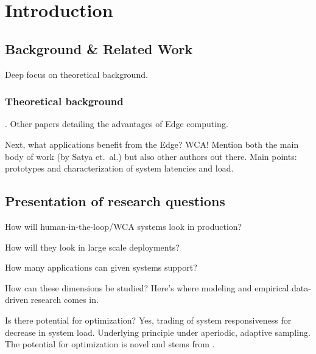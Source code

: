 \chapter{Introduction}

\section{Background \& Related Work}

Deep focus on theoretical background.

\subsection{Theoretical background}
\textcite{Satya2009Case}.
Other papers detailing the advantages of Edge computing.

Next, what applications benefit from the Edge?
\ac{WCA}! Mention both the main body of work (by Satya et.\ al.) but also other authors out there.
Main points: prototypes and characterization of system latencies and load.


\section{Presentation of research questions}

How will human-in-the-loop/\ac{WCA} systems look in production?

How will they look in large scale deployments?

How many applications can given systems support?

How can these dimensions be studied?
Here's where modeling and empirical data-driven research comes in.

Is there potential for optimization?
Yes, trading of system responsiveness for decrease in system load.
Underlying principle under aperiodic, adaptive sampling.
The potential for optimization is novel and stems from \textcite{Olguin:ImpactWCA2021}.